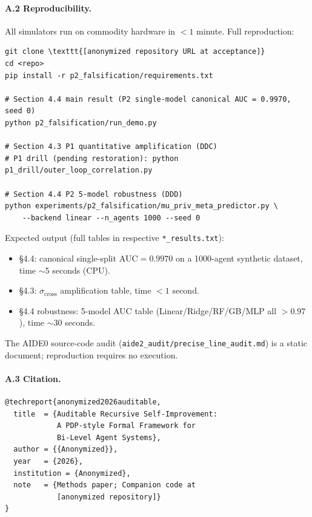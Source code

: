 \documentclass{article}
\theoremstyle{definition}
\begin{document}
\paragraph{A.2 Reproducibility.}
All simulators run on commodity hardware in $<1$ minute. Full reproduction:

\begin{verbatim}
git clone \texttt{[anonymized repository URL at acceptance]}
cd <repo>
pip install -r p2_falsification/requirements.txt

# Section 4.4 main result (P2 single-model canonical AUC = 0.9970, seed 0)
python p2_falsification/run_demo.py

# Section 4.3 P1 quantitative amplification (DDC)
# P1 drill (pending restoration): python p1_drill/outer_loop_correlation.py

# Section 4.4 P2 5-model robustness (DDD)
python experiments/p2_falsification/mu_priv_meta_predictor.py \
    --backend linear --n_agents 1000 --seed 0
\end{verbatim}

Expected output (full tables in respective \texttt{*\_results.txt}):
\begin{itemize}
    \item \S4.4: canonical single-split $\text{AUC} = 0.9970$ on a 1000-agent synthetic dataset, time $\sim$5 seconds (CPU).
    \item \S4.3: $\sigma_{\text{cross}}$ amplification table, time $<1$ second.
    \item \S4.4 robustness: 5-model AUC table (Linear/Ridge/RF/GB/MLP all $> 0.97$), time $\sim$30 seconds.
\end{itemize}

The AIDE0 source-code audit (\texttt{aide2\_audit/precise\_line\_audit.md}) is a static document; reproduction requires no execution.

\paragraph{A.3 Citation.}
\begin{verbatim}
@techreport{anonymized2026auditable,
  title  = {Auditable Recursive Self-Improvement:
            A PDP-style Formal Framework for
            Bi-Level Agent Systems},
  author = {{Anonymized}},
  year   = {2026},
  institution = {Anonymized},
  note   = {Methods paper; Companion code at
            [anonymized repository]}
}
\end{verbatim}
\end{document}
